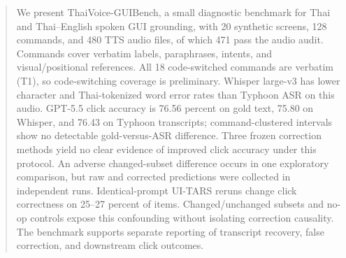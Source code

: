 \begin{abstract}
We present ThaiVoice-GUIBench, a small diagnostic benchmark for Thai and Thai--English spoken GUI grounding, with 20 synthetic screens, 128 commands, and 480 TTS audio files, of which 471 pass the audio audit. Commands cover verbatim labels, paraphrases, intents, and visual/positional references. All 18 code-switched commands are verbatim (T1), so code-switching coverage is preliminary. Whisper large-v3 has lower character and Thai-tokenized word error rates than Typhoon ASR on this audio. GPT-5.5 click accuracy is 76.56 percent on gold text, 75.80 on Whisper, and 76.43 on Typhoon transcripts; command-clustered intervals show no detectable gold-versus-ASR difference. Three frozen correction methods yield no clear evidence of improved click accuracy under this protocol. An adverse changed-subset difference occurs in one exploratory comparison, but raw and corrected predictions were collected in independent runs. Identical-prompt UI-TARS reruns change click correctness on 25--27 percent of items. Changed/unchanged subsets and no-op controls expose this confounding without isolating correction causality. The benchmark supports separate reporting of transcript recovery, false correction, and downstream click outcomes.
\end{abstract}
